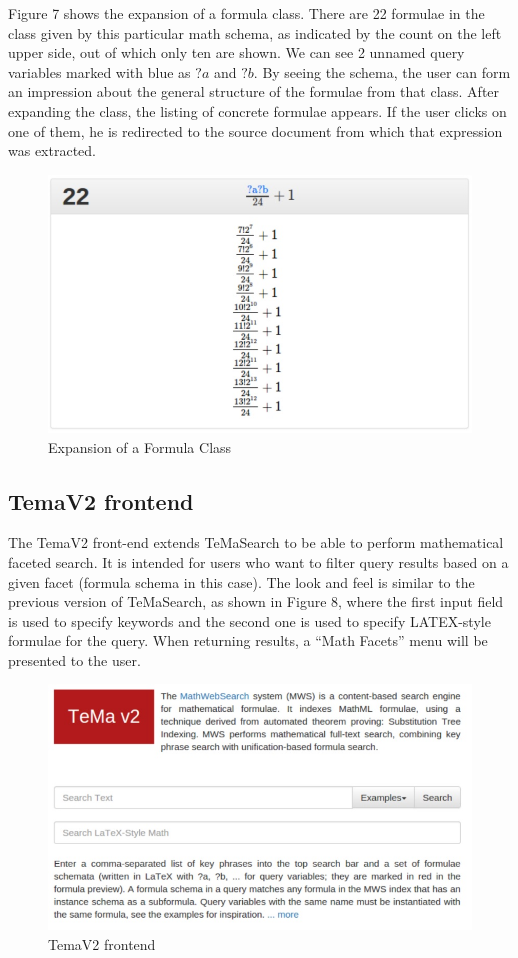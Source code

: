 \documentclass{deliverablereport}
\begin{document}
Figure 7 shows the expansion of a formula class. There are 22 formulae in the class given by this particular math schema, as indicated by the count on the left upper side, out of which only ten are shown. We can see 2 unnamed query variables marked with blue as $?a$ and $?b$. By seeing the schema, the user can form an impression about the general structure of the formulae from that class. After expanding the class, the listing of concrete formulae appears. If the user clicks on one of them, he is redirected to the source document from which that expression was extracted. 

\begin{figure}[H]
\centering
 \includegraphics[scale=0.8]{figure7.jpg}
 \caption{Expansion of a Formula Class}
\end{figure}

\subsection{TemaV2 frontend}\label{v2}

The TemaV2 front-end extends TeMaSearch to be able to perform mathematical faceted search. It is intended for users who want to filter query results based on a given facet (formula schema in this case). The look and feel is similar to the previous version of TeMaSearch, as shown in Figure 8, where the first input field is used to specify keywords and the second one is used to specify LATEX-style formulae for the query. When returning results, a “Math Facets” menu will be presented to the user. 

\begin{figure}[H]
\centering
 \includegraphics[scale=0.8]{figure8.jpg}
 \caption{TemaV2 frontend}
\end{figure}
\end{document}
